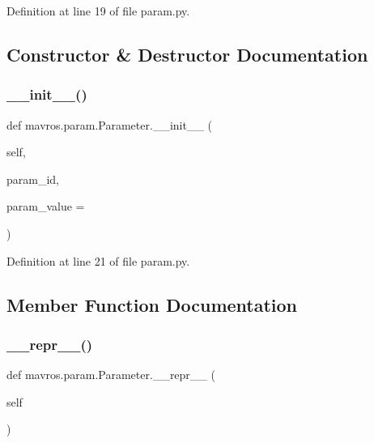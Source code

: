 Definition at line 19 of file param.\+py.



\subsection{Constructor \& Destructor Documentation}
\mbox{\label{classmavros_1_1param_1_1Parameter_a5b610dd3a7456ae623f1ee491ca6b15a}} 
\subsubsection{\texorpdfstring{\_\_init\_\_()}{\_\_init\_\_()}}
{\footnotesize\ttfamily def mavros.\+param.\+Parameter.\+\_\+\+\_\+init\+\_\+\+\_\+ (\begin{DoxyParamCaption}\item[{}]{self,  }\item[{}]{param\+\_\+id,  }\item[{}]{param\+\_\+value = {} }\end{DoxyParamCaption})}



Definition at line 21 of file param.\+py.



\subsection{Member Function Documentation}
\mbox{\label{classmavros_1_1param_1_1Parameter_aaea16c91991f42b0ff901259d5216568}} 
\subsubsection{\texorpdfstring{\_\_repr\_\_()}{\_\_repr\_\_()}}
{\footnotesize\ttfamily def mavros.\+param.\+Parameter.\+\_\+\+\_\+repr\+\_\+\+\_\+ (\begin{DoxyParamCaption}\item[{}]{self }\end{DoxyParamCaption})}



